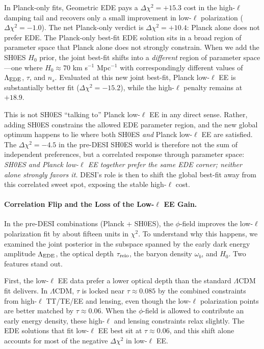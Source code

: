 \documentclass[a4paper,11pt]{article}
\begin{document}
In Planck-only fits, Geometric EDE pays a $\Delta\chi^2 = +15.3$ cost in the high-$\ell$ damping tail and recovers only a small improvement in low-$\ell$ polarization ($\Delta\chi^2 = -1.0$). The net Planck-only verdict is $\Delta\chi^2 = +10.4$: Planck alone does not prefer EDE. The Planck-only best-fit EDE solution sits in a broad region of parameter space that Planck alone does not strongly constrain. When we add the SH0ES $H_0$ prior, the joint best-fit shifts into a \emph{different} region of parameter space---one where $H_0 \approx 70$ km s$^{-1}$ Mpc$^{-1}$ with correspondingly different values of $\Lambda_{\rm EDE}$, $\tau$, and $n_s$. Evaluated at this new joint best-fit, Planck low-$\ell$ EE is substantially better fit ($\Delta\chi^2 = -15.2$), while the high-$\ell$ penalty remains at $+18.9$.

This is not SH0ES ``talking to'' Planck low-$\ell$ EE in any direct sense. Rather, adding SH0ES constrains the allowed EDE parameter region, and the new global optimum happens to lie where both SH0ES \emph{and} Planck low-$\ell$ EE are satisfied. The $\Delta\chi^2 = -4.5$ in the pre-DESI SH0ES world is therefore not the sum of independent preferences, but a correlated response through parameter space: \emph{SH0ES and Planck low-$\ell$ EE together prefer the same EDE corner; neither alone strongly favors it.} DESI's role is then to shift the global best-fit away from this correlated sweet spot, exposing the stable high-$\ell$ cost.

\paragraph{Correlation Flip and the Loss of the Low-$\ell$ EE Gain.}
In the pre-DESI combinations (Planck + SH0ES), the $\phi$-field improves the low-$\ell$ polarization fit by about fifteen units in $\chi^2$. To understand why this happens, we examined the joint posterior in the subspace spanned by the early dark energy amplitude $\Lambda_{\rm EDE}$, the optical depth $\tau_{\rm reio}$, the baryon density $\omega_b$, and $H_0$. Two features stand out.

First, the low-$\ell$ EE data prefer a lower optical depth than the standard $\Lambda$CDM fit delivers. In $\Lambda$CDM, $\tau$ is locked near $\tau \approx 0.085$ by the combined constraints from high-$\ell$ TT/TE/EE and lensing, even though the low-$\ell$ polarization points are better matched by $\tau \approx 0.06$. When the $\phi$-field is allowed to contribute an early energy density, these high-$\ell$ and lensing constraints relax slightly. The EDE solutions that fit low-$\ell$ EE best sit at $\tau \approx 0.06$, and this shift alone accounts for most of the negative $\Delta\chi^2$ in low-$\ell$ EE.
\end{document}
